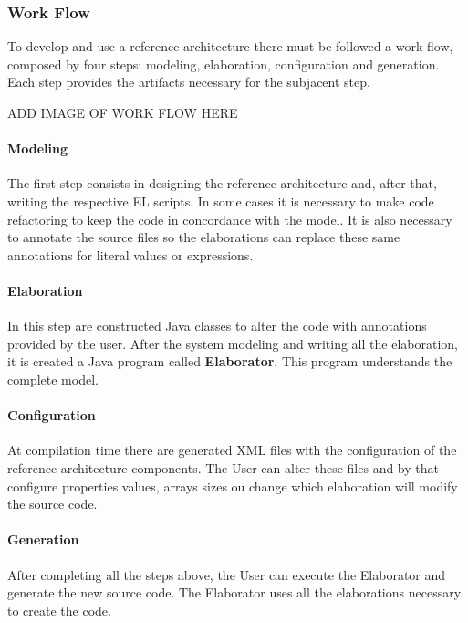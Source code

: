 \documentclass{report}
\begin{document}
			\subsubsection{Work Flow}
		
			\par To develop and use a reference architecture there must be followed a work flow, composed by four steps: modeling, elaboration, configuration and generation. Each step provides the artifacts necessary for the subjacent step.
			
			\par ADD IMAGE OF WORK FLOW HERE
		
			\paragraph{Modeling} The first step consists in designing the reference architecture and, after that, writing the respective EL scripts. In some cases it is necessary to make code refactoring to keep the code in concordance with the model. It is also necessary to annotate the source files so the elaborations can replace these same annotations for literal values or expressions.

			\paragraph{Elaboration} In this step are constructed Java classes to alter the code with annotations provided by the user. After the system modeling and writing all the elaboration, it is created a Java program called \textbf{Elaborator}. This program understands the complete model.

			\paragraph{Configuration} At compilation time there are generated XML files with the configuration of the reference architecture components. The User can alter these files and by that configure properties values, arrays sizes ou change which elaboration will modify the source code.

			\paragraph{Generation} After completing all the steps above, the User can execute the Elaborator and generate the new source code. The Elaborator uses all the elaborations necessary to create the code.
			
\end{document}
